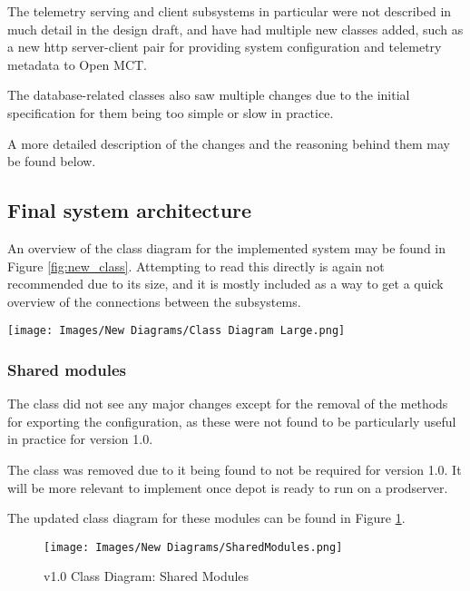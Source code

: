 The telemetry serving and client subsystems in particular were not described in much detail in the design draft, and have had multiple new classes added, such as a new \acrshort{http} server-client pair for providing system configuration and telemetry metadata to Open MCT.

The database-related classes also saw multiple changes due to the initial specification for them being too simple or slow in practice.

A more detailed description of the changes and the reasoning behind them may be found below.

\subsection{Final system architecture}
An overview of the class diagram for the implemented system may be found in Figure \ref{fig:new_class}. Attempting to read this directly is again not recommended due to its size, and it is mostly included as a way to get a quick overview of the connections between the subsystems.

\begin{sidewaysfigure}[ht]
  \centering
  \texttt{[image: Images/New Diagrams/Class Diagram Large.png]}
  \caption{v1.0 Class Diagram Overview}
  \label{fig:new_class}
\end{sidewaysfigure}

\subsubsection{Shared modules}
The  class did not see any major changes except for the removal of the methods for exporting the configuration, as these were not found to be particularly useful in practice for version 1.0.

The  class was removed due to it being found to not be required for version 1.0. It will be more relevant to implement once \Gls{depot} is ready to run on a \gls{prodserver}.

The updated class diagram for these modules can be found in Figure \ref{fig:new_cdshared}.

\begin{figure}[H]
  \centering
  \texttt{[image: Images/New Diagrams/SharedModules.png]}
  \caption{v1.0 Class Diagram: Shared Modules}
  \label{fig:new_cdshared}
\end{figure}

